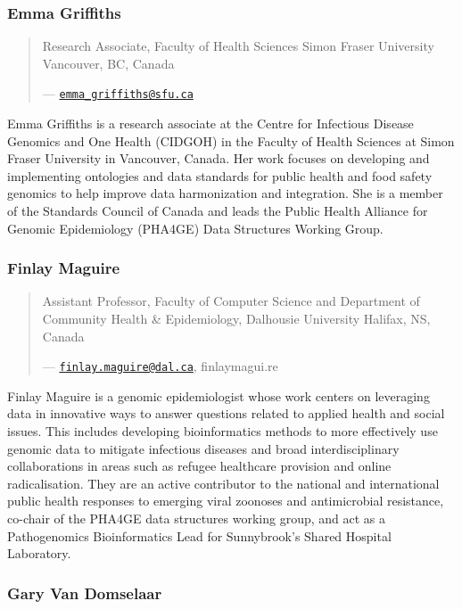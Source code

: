 \documentclass[
]{book}
\begin{document}
\subsubsection{Emma Griffiths}\label{emma-griffiths}

\begin{quote}
Research Associate, Faculty of Health Sciences
Simon Fraser University
Vancouver, BC, Canada

--- \href{mailto:emma_griffiths@sfu.ca}{\nolinkurl{emma\_griffiths@sfu.ca}}
\end{quote}

Emma Griffiths is a research associate at the Centre for Infectious Disease Genomics and One Health (CIDGOH) in the Faculty of Health Sciences at Simon Fraser University in Vancouver, Canada. Her work focuses on developing and implementing ontologies and data standards for public health and food safety genomics to help improve data harmonization and integration. She is a member of the Standards Council of Canada and leads the Public Health Alliance for Genomic Epidemiology (PHA4GE) Data Structures Working Group.

\subsubsection{Finlay Maguire}\label{finlay-maguire}

\begin{quote}
Assistant Professor, Faculty of Computer Science and Department of Community Health \& Epidemiology,
Dalhousie University
Halifax, NS, Canada

--- \href{mailto:finlay.maguire@dal.ca}{\nolinkurl{finlay.maguire@dal.ca}}, finlaymagui.re
\end{quote}

Finlay Maguire is a genomic epidemiologist whose work centers on leveraging data in innovative ways to answer questions related to applied health and social issues. This includes developing bioinformatics methods to more effectively use genomic data to mitigate infectious diseases and broad interdisciplinary collaborations in areas such as refugee healthcare provision and online radicalisation. They are an active contributor to the national and international public health responses to emerging viral zoonoses and antimicrobial resistance, co-chair of the PHA4GE data structures working group, and act as a Pathogenomics Bioinformatics Lead for Sunnybrook's Shared Hospital Laboratory.

\subsubsection{Gary Van Domselaar}\label{gary-van-domselaar}
\end{document}
